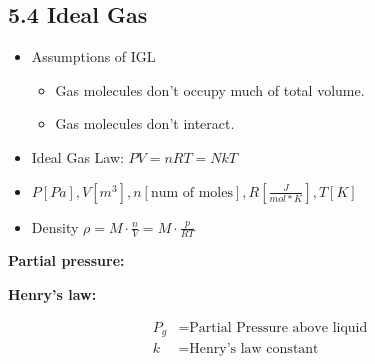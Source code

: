 \subsection{5.4 Ideal Gas}
    \begin{itemize}
        \itemsep0em
        \item Assumptions of IGL\:
        \begin{itemize}
            \itemsep0em
            \item Gas molecules don't occupy much of total volume.
            \item Gas molecules don't interact.
        \end{itemize}
        \item Ideal Gas Law: $PV = nRT=N kT$
        \item $P\left[Pa\right], V\left[m^3\right], n\left[\text{num of moles}\right], R\left[\frac{J}{mol*K}\right], T\left[K\right]$
        \item Density $\rho = M \cdot \frac{n}{V} = M \cdot \frac{p}{RT}$
    \end{itemize}

    \textbf{Partial pressure:}
    
    \textbf{Henry's law:}\\
    \begin{minipage}{0.99\linewidth}
        \begin{minipage}{0.3\linewidth}
            \vspace*{0.5em}
        \end{minipage}
        \begin{minipage}{0.69\linewidth}
            \begin{align*}
                P_g &= \text{Partial Pressure above liquid}\\
                k &= \text{Henry's law constant}
            \end{align*}
        \end{minipage}
    \end{minipage}
    \vspace*{0.2em}